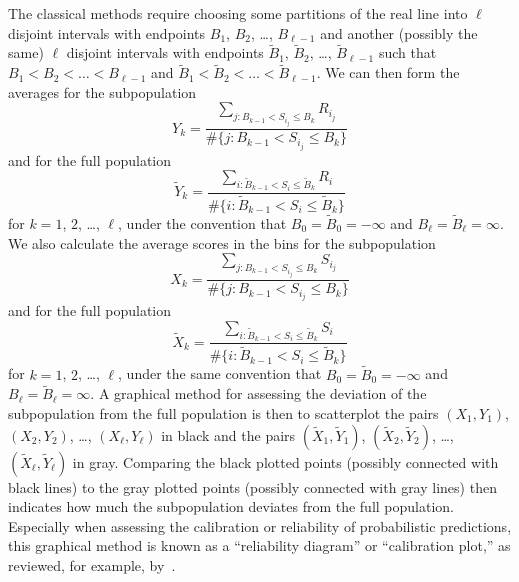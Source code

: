 \documentclass{article}
\begin{document}
The classical methods require choosing some partitions of the real line
into $\ell$ disjoint intervals with endpoints $B_1$, $B_2$, \dots, $B_{\ell-1}$
and another (possibly the same) $\ell$ disjoint intervals with endpoints
$\tilde{B}_1$, $\tilde{B}_2$, \dots, $\tilde{B}_{\ell-1}$
such that $B_1 < B_2 < \dots < B_{\ell-1}$
and $\tilde{B}_1 < \tilde{B}_2 < \dots < \tilde{B}_{\ell-1}$.
We can then form the averages for the subpopulation
%
\begin{equation}
\label{subY}
Y_k = \frac{\sum_{j : B_{k-1} < S_{i_j} \le B_k} R_{i_j}}
           {\#\{j : B_{k-1} < S_{i_j} \le B_k\}}
\end{equation}
%
and for the full population
%
\begin{equation}
\label{fullY}
\tilde{Y}_k = \frac{\sum_{i : \tilde{B}_{k-1} < S_i \le \tilde{B}_k} R_i}
                   {\#\{i : \tilde{B}_{k-1} < S_i \le \tilde{B}_k\}}
\end{equation}
%
for $k = 1$, $2$, \dots, $\ell$,
under the convention that $B_0 = \tilde{B}_0 = -\infty$
and $B_{\ell} = \tilde{B}_{\ell} = \infty$.
We also calculate the average scores in the bins for the subpopulation
%
\begin{equation}
\label{subX}
X_k = \frac{\sum_{j : B_{k-1} < S_{i_j} \le B_k} S_{i_j}}
           {\#\{j : B_{k-1} < S_{i_j} \le B_k\}}
\end{equation}
%
and for the full population
%
\begin{equation}
\label{fullX}
\tilde{X}_k = \frac{\sum_{i : \tilde{B}_{k-1} < S_i \le \tilde{B}_k} S_i}
                   {\#\{i : \tilde{B}_{k-1} < S_i \le \tilde{B}_k\}}
\end{equation}
%
for $k = 1$, $2$, \dots, $\ell$,
under the same convention that $B_0 = \tilde{B}_0 = -\infty$
and $B_{\ell} = \tilde{B}_{\ell} = \infty$.
A graphical method for assessing the deviation of the subpopulation
from the full population is then to scatterplot the pairs
$(X_1, Y_1)$, $(X_2, Y_2)$, \dots, $(X_{\ell}, Y_{\ell})$ in black
and the pairs $(\tilde{X}_1, \tilde{Y}_1)$, $(\tilde{X}_2, \tilde{Y}_2)$,
\dots, $(\tilde{X}_{\ell}, \tilde{Y}_{\ell})$ in gray.
Comparing the black plotted points (possibly connected with black lines)
to the gray plotted points (possibly connected with gray lines)
then indicates how much the subpopulation deviates from the full population.
Especially when assessing the calibration or reliability
of probabilistic predictions, this graphical method is known
as a ``reliability diagram'' or ``calibration plot,''
as reviewed, for example, by~\cite{tygert}.
\end{document}
